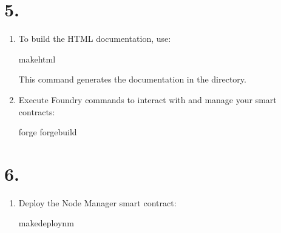 \documentclass[letterpaper,10pt,english]{sphinxmanual}
\begin{document}
\section{5. }
\label{\detokenize{quickstart:building-and-running-the-project}}\begin{enumerate}
%
\item {} 
\sphinxAtStartPar
{}

\sphinxAtStartPar
To build the HTML documentation, use:

\begin{sphinxVerbatim}[commandchars=\\\{\}]
makehtml
\end{sphinxVerbatim}

\sphinxAtStartPar
This command generates the documentation in the  directory.

\item {} 
\sphinxAtStartPar
{}

\sphinxAtStartPar
Execute Foundry commands to interact with and manage your smart contracts:

\begin{sphinxVerbatim}[commandchars=\\\{\}]
forge
forgebuild
\end{sphinxVerbatim}

\end{enumerate}


\section{6. }
\label{\detokenize{quickstart:deploying-smart-contracts}}\label{\detokenize{quickstart:deployment}}\begin{enumerate}
%
\item {} 
\sphinxAtStartPar
{}

\sphinxAtStartPar
Deploy the Node Manager smart contract:

\begin{sphinxVerbatim}[commandchars=\\\{\}]
makedeploy\PYGZhy{}nm
\end{sphinxVerbatim}

\end{enumerate}
\end{document}
